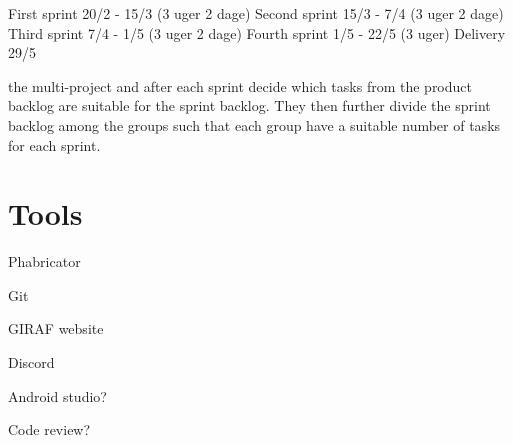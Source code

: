 First sprint 20/2 - 15/3 	(3 uger 2 dage)
Second sprint 15/3 - 7/4 	(3 uger 2 dage)
Third sprint 7/4 - 1/5		(3 uger 2 dage)
Fourth sprint 1/5 - 22/5 	(3 uger)
Delivery 29/5


the
multi-project and after each sprint decide which tasks from the product backlog are suitable
for the sprint backlog. They then further divide the sprint backlog among the
groups such that each group have a suitable number of tasks for each sprint.\nl


\section{Tools}

Phabricator

Git

GIRAF website

Discord

Android studio?

Code review?

